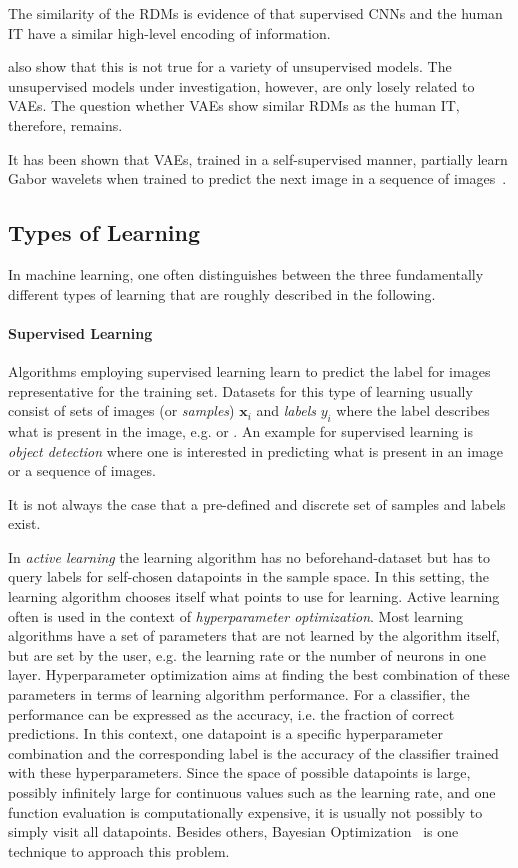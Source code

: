 The similarity of the \acp{RDM} is evidence of that supervised \acp{CNN} and the human \ac{IT} have a similar high-level encoding of information.

\citet{khaligh2014deep} also show that this is not true for a variety of unsupervised models.
The unsupervised models under investigation, however, are only losely related to \acp{VAE}.
The question whether \acp{VAE} show similar \acp{RDM} as the human \ac{IT}, therefore, remains.

It has been shown that \acp{VAE}, trained in a self-supervised manner, partially learn Gabor wavelets when trained to predict the next image in a sequence of images~\citep{palm2012prediction}.

\subsection{Types of Learning}\label{subsec:types-of-learning}

In machine learning, one often distinguishes between the three fundamentally different types of learning that are roughly described in the following.

\paragraph{Supervised Learning}
Algorithms employing supervised learning learn to predict the label for images representative for the training set.
Datasets for this type of learning usually consist of sets of images (or \textit{samples}) $\bm{x}_i$ and \textit{labels} $y_i$ where the label describes what is present in the image, e.g.  or .
An example for supervised learning is \textit{object detection} where one is interested in predicting what is present in an image or a sequence of images.

It is not always the case that a pre-defined and discrete set of samples and labels exist.

In \textit{active learning} the learning algorithm has no beforehand-dataset but has to query labels for self-chosen datapoints in the sample space.
In this setting, the learning algorithm chooses itself what points to use for learning.
Active learning often is used in the context of \textit{hyperparameter optimization}.
Most learning algorithms have a set of parameters that are not learned by the algorithm itself, but are set by the user, e.g. the learning rate or the number of neurons in one layer.
Hyperparameter optimization aims at finding the best combination of these parameters in terms of learning algorithm performance.
For a classifier, the performance can be expressed as the accuracy, i.e. the fraction of correct predictions.
In this context, one datapoint is a specific hyperparameter combination and the corresponding label is the accuracy of the classifier trained with these hyperparameters.
Since the space of possible datapoints is large, possibly infinitely large for continuous values such as the learning rate, and one function evaluation is computationally expensive, it is usually not possibly to simply visit all datapoints.
Besides others, Bayesian Optimization~\citep{mockus1978application} is one technique to approach this problem.

